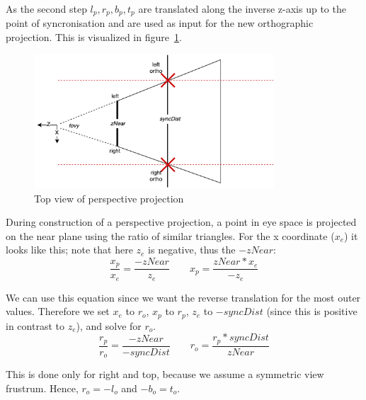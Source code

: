 \documentclass{article}
\begin{document}
As the second step $l_p,r_p,b_p,t_p$ are translated along the inverse z-axis up to the point of syncronisation and are used as input for the new orthographic projection. This is visualized in figure~\ref{fig:projections}.

\begin{figure}[H]
  \centering
  \label{fig:projections}
  \includegraphics[width=0.8\textwidth]{projections}
  \caption{Top view of perspective projection}
\end{figure}

During construction of a perspective projection, a point in eye space is projected on the near plane using the ratio of similar triangles. For the x coordinate ($x_e$) it looks like this; note that here $z_e$ is negative, thus the $-zNear$:
\begin{equation}
    \frac{x_p}{x_e} = \frac{-zNear}{z_e}\qquad
    x_p = \frac{zNear*x_e}{-z_e}
\end{equation}

We can use this equation since we want the reverse translation for the most outer values. Therefore we set $x_e$ to $r_o$, $x_p$ to $r_p$, $z_e$ to $-syncDist$ (since this is positive in contrast to $z_e$), and solve for $r_o$.
\begin{equation}
    \frac{r_p}{r_o} = \frac{-zNear}{-syncDist}\qquad
    r_o = \frac{r_p*syncDist}{zNear}
\end{equation}

This is done only for right and top, because we assume a symmetric view frustrum. Hence, $r_o = -l_o$ and $-b_o = t_o$.
\end{document}
